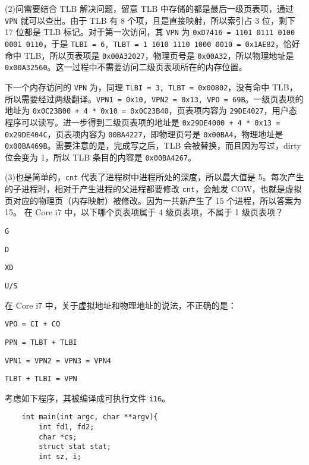\begin{problems}
        (2)问需要结合 TLB 解决问题，留意 TLB 中存储的都是最后一级页表项，通过 \verb|VPN| 就可以查出。由于 TLB 有 8 个项，且是直接映射，所以索引占 3 位，剩下 17 位都是 TLB 标记。对于第一次访问，其 \verb|VPN| 为 \verb|0xD7416 = 1101 0111 0100 0001 0110|，于是 \verb|TLBI = 6, TLBT = 1 1010 1110 1000 0010 = 0x1AE82|，恰好命中 TLB，所以页表项是 \verb|0x00A32027|，物理页号是 \verb|0x00A32|，所以物理地址是 \verb|0x00A32560|。这一过程中不需要访问二级页表项所在的内存位置。
        
        下一个内存访问的 \verb|VPN| 为，同理 \verb|TLBI = 3, TLBT = 0x00802|，没有命中 TLB，所以需要经过两级翻译。\verb|VPN1 = 0x10, VPN2 = 0x13, VPO = 69B|。一级页表项的地址为 \verb|0x0C23B00 + 4 * 0x10 = 0x0C23B40|，页表项内容为 \verb|29DE4027|，用户态程序可以读写。进一步得到二级页表项的地址是 \verb|0x29DE4000 + 4 * 0x13 = 0x29DE404C|，页表项内容为 \verb|00BA4227|，即物理页号是 \verb|0x00BA4|，物理地址是 \verb|0x00BA469B|。需要注意的是，完成写之后，TLB 会被替换，而且因为写过，dirty 位会变为 1，所以 TLB 条目的内容是 \verb|0x00BA4267|。

        (3)也是简单的，\verb|cnt| 代表了进程树中进程所处的深度，所以最大值是 5。每次产生的子进程时，相对于产生进程的父进程都要修改 \verb|cnt|，会触发 COW，也就是虚拟页对应的物理页（内存映射）被修改。因为一共新产生了 15 个进程，所以答案为 15。
         在 Core i7 中，以下哪个页表项属于 4 级页表项，不属于 1 级页表项？
        \begin{choices}
            \item \verb|G|
            \item \verb|D|
            \item \verb|XD|
            \item \verb|U/S|
        \end{choices}
         在 Core i7 中，关于虚拟地址和物理地址的说法，不正确的是：
        \begin{choices}
            \item \verb|VPO = CI + CO|
            \item \verb|PPN = TLBT + TLBI|
            \item \verb|VPN1 = VPN2 = VPN3 = VPN4|
            \item \verb|TLBT + TLBI = VPN|
        \end{choices}
         考虑如下程序，其被编译成可执行文件 \verb|i16|。
        \begin{verbatim}
    int main(int argc, char **argv){
        int fd1, fd2;
        char *cs;
        struct stat stat;
        int sz, i;


\end{verbatim}
\end{problems}

